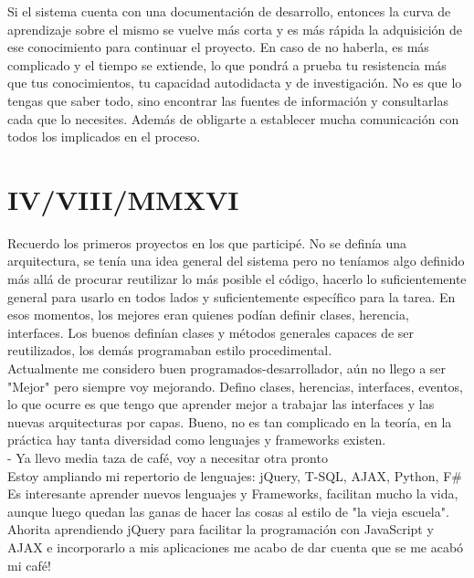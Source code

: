 \documentclass[12pt,spanish,lettersize]{book}
\begin{document}
Si el sistema cuenta con una documentaci\'on de desarrollo, entonces la curva de aprendizaje sobre el mismo se vuelve m\'as corta y es m\'as r\'apida la adquisici\'on de ese conocimiento para continuar el proyecto. En caso de no haberla, es m\'as complicado y el tiempo se extiende, lo que pondr\'a a prueba tu resistencia m\'as que tus conocimientos, tu capacidad autodidacta y de investigaci\'on. No es que lo tengas que saber todo, sino encontrar las fuentes de informaci\'on y consultarlas cada que lo necesites. Adem\'as de obligarte a establecer mucha comunicaci\'on con todos los implicados en el proceso. 

\section{IV/VIII/MMXVI}

Recuerdo los primeros proyectos en los que particip\'e. No se defin\'ia una arquitectura, se ten\'ia una idea general del sistema pero no ten\'iamos algo definido m\'as all\'a de procurar reutilizar lo m\'as posible el c\'odigo, hacerlo lo suficientemente general para usarlo en todos lados y suficientemente espec\'ifico para la tarea. En esos momentos, los mejores eran quienes pod\'ian definir clases, herencia, interfaces. Los buenos defin\'ian clases y m\'etodos generales capaces de ser reutilizados, los dem\'as programaban estilo procedimental.\\

Actualmente me considero buen programados-desarrollador, a\'un no llego a ser "Mejor" pero siempre voy mejorando. Defino clases, herencias, interfaces, eventos, lo que ocurre es que tengo que aprender mejor a trabajar las interfaces y las nuevas arquitecturas por capas. Bueno, no es tan complicado en la teor\'ia, en la pr\'actica hay tanta diversidad como lenguajes y frameworks existen. \\

- Ya llevo media taza de caf\'e, voy a necesitar otra pronto \\

Estoy ampliando mi repertorio de lenguajes: jQuery, T-SQL, AJAX, Python, F\#\\ 

Es interesante aprender nuevos lenguajes y Frameworks, facilitan mucho la vida, aunque luego quedan las ganas de hacer las cosas al estilo de "la vieja escuela". Ahorita aprendiendo jQuery para facilitar la programaci\'on con JavaScript y AJAX e incorporarlo a mis aplicaciones me acabo de dar cuenta que se me acab\'o mi caf\'e! \\
\end{document}
